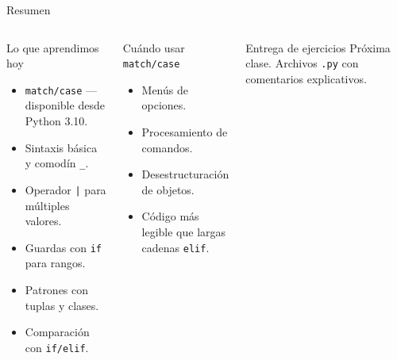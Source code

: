 \documentclass[aspectratio=169,xcolor=dvipsnames]{beamer}
\begin{document}
\begin{frame}{Resumen}
    \begin{columns}
        \begin{block}{Lo que aprendimos hoy}
            \begin{itemize}
                \item \texttt{match/case} — disponible desde Python 3.10.
                \item Sintaxis básica y comodín \texttt{\_}.
                \item Operador \texttt{|} para múltiples valores.
                \item Guardas con \texttt{if} para rangos.
                \item Patrones con tuplas y clases.
                \item Comparación con \texttt{if/elif}.
            \end{itemize}
        \end{block}

        \begin{exampleblock}{Cuándo usar \texttt{match/case}}
            \begin{itemize}
                \item Menús de opciones.
                \item Procesamiento de comandos.
                \item Desestructuración de objetos.
                \item Código más legible que largas cadenas \texttt{elif}.
            \end{itemize}
        \end{exampleblock}

        \vspace{0.3cm}
        \begin{alertblock}{Entrega de ejercicios}
            Próxima clase. Archivos \texttt{.py} con comentarios explicativos.
        \end{alertblock}
    \end{columns}
\end{frame}
\end{document}
